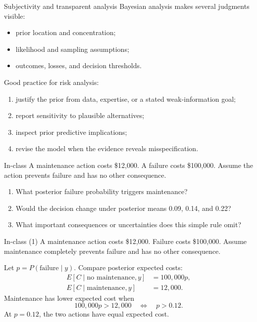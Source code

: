\documentclass[aspectratio=43,11pt]{beamer}
\begin{document}
\begin{frame}{Subjectivity and transparent analysis}
Bayesian analysis makes several judgments visible:
\begin{itemize}
  \item prior location and concentration;
  \item likelihood and sampling assumptions;
  \item outcomes, losses, and decision thresholds.
\end{itemize}
Good practice for risk analysis:
\begin{enumerate}
  \item justify the prior from data, expertise, or a stated weak-information goal;
  \item report sensitivity to plausible alternatives;
  \item inspect prior predictive implications;
  \item revise the model when the evidence reveals misspecification.
\end{enumerate}
\end{frame}

\begin{frame}{In-class}
A maintenance action costs \$12,000. A failure costs \$100,000. Assume the action prevents failure and has no other consequence.
\begin{enumerate}
  \item What posterior failure probability triggers maintenance?
  \item Would the decision change under posterior means 0.09, 0.14, and 0.22?
  \item What important consequences or uncertainties does this simple rule omit?
\end{enumerate}
\vspace{.6em}
\end{frame}

\begin{frame}{In-class (1)}
A maintenance action costs \$12,000. Failure costs \$100,000. Assume maintenance completely prevents failure and has no other consequence.

Let $p=P(\text{failure}\mid y)$. Compare posterior expected costs:
\[
\begin{aligned}
E[C\mid\text{no maintenance},y] &= 100{,}000p,\\
E[C\mid\text{maintenance},y] &= 12{,}000.
\end{aligned}
\]
Maintenance has lower expected cost when
\[
100{,}000p>12{,}000
\quad\Longleftrightarrow\quad
\boxed{p>0.12}.
\]
At $p=0.12$, the two actions have equal expected cost.
\end{frame}
\end{document}
